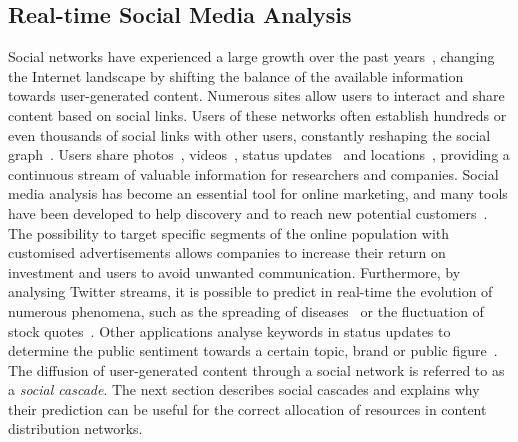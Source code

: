 

% 
\subsection*{Real-time Social Media Analysis}

Social networks have experienced a large growth over the past years~\cite{flickr-growth}, changing the
Internet landscape by shifting the balance of the available information towards user-generated content.
Numerous sites allow users to interact and share content based on social links. Users of these networks
often establish hundreds or even thousands of social links with other users, constantly reshaping the
social graph~\cite{fb-interactions}.
Users share photos~\cite{flickr, facebook}, videos~\cite{youtube}, status updates~\cite{twitter} and
locations~\cite{foursquare}, providing a continuous stream of valuable information for researchers and
companies. 
Social media analysis has become an essential tool for online marketing, and many tools have been
developed to help discovery and to reach new potential customers~\cite{wildfire, brandwatch}. The
possibility to target specific segments of the online population with customised advertisements allows
companies to increase their return on investment and users to avoid unwanted communication.
Furthermore, by analysing Twitter streams, it is possible to predict in real-time the evolution of
numerous phenomena, such as the spreading of diseases~\cite{mappyhealth} or the fluctuation of stock
quotes~\cite{twitter-stocks}. Other applications analyse keywords in status updates to determine the
public sentiment towards a certain topic, brand or public figure~\cite{socialmention, twendz, tweetfeel}.
The diffusion of user-generated content through a social network is referred to as a \emph{social
cascade}. The next section describes social cascades and explains why their prediction can be useful for
the correct allocation of resources in content distribution networks.
% 
